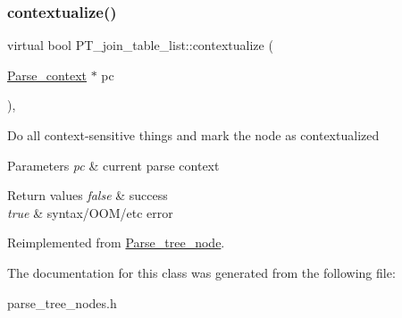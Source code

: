 \subsubsection{\texorpdfstring{contextualize()}{contextualize()}}
{\footnotesize\ttfamily virtual bool P\+T\+\_\+join\+\_\+table\+\_\+list\+::contextualize (\begin{DoxyParamCaption}\item[{\mbox{\hyperlink{structParse__context}{Parse\+\_\+context}} $\ast$}]{pc }\end{DoxyParamCaption})\hspace{0.3cm}{\ttfamily [inline]}, {\ttfamily [virtual]}}

Do all context-\/sensitive things and mark the node as contextualized


\begin{DoxyParams}{Parameters}
{\em pc} & current parse context\\
\hline
\end{DoxyParams}

\begin{DoxyRetVals}{Return values}
{\em false} & success \\
\hline
{\em true} & syntax/\+O\+O\+M/etc error \\
\hline
\end{DoxyRetVals}


Reimplemented from \mbox{\hyperlink{classParse__tree__node_a22d93524a537d0df652d7efa144f23da}{Parse\+\_\+tree\+\_\+node}}.



The documentation for this class was generated from the following file\+:\begin{DoxyCompactItemize}
\item 
parse\+\_\+tree\+\_\+nodes.\+h\end{DoxyCompactItemize}

